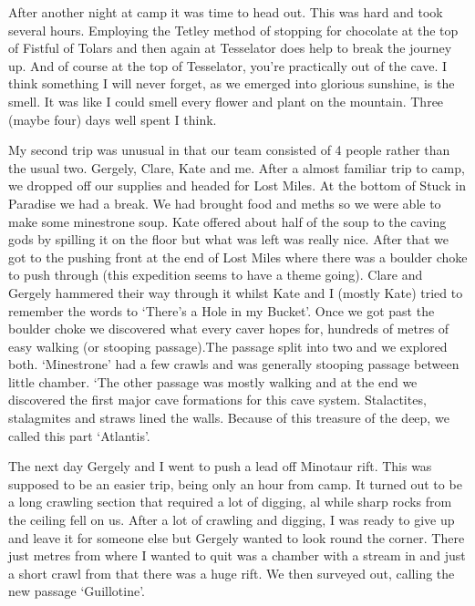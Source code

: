 After another night at camp it was time to head out. This was hard and took several hours. Employing the Tetley method of stopping for chocolate at the top of Fistful of Tolars and then again at Tesselator does help to break the journey up. And of course at the top of Tesselator, you’re practically out of the cave. I think something I will never forget, as we emerged into glorious sunshine, is the smell. It was like I could smell every flower and plant on the mountain. Three (maybe four) days well spent I think.

My second trip was unusual in that our team consisted of 4 people rather than the usual two. Gergely, Clare, Kate and me. After a almost familiar trip to camp, we dropped off our supplies and headed for Lost Miles. At the bottom of Stuck in Paradise we had a break. We had brought food and meths so we were able to make some minestrone soup. Kate offered about half of the soup to the caving gods by spilling it on the floor but what was left was really nice. After that we got to the pushing front at the end of Lost Miles where there was a boulder choke to push through (this expedition seems to have a theme going). Clare and Gergely hammered their way through it whilst Kate and I (mostly Kate) tried to remember the words to ‘There’s a Hole in my Bucket’. Once we got past the boulder choke we discovered what every caver hopes for, hundreds of metres of easy walking (or stooping passage).The passage split into two and we explored both. ‘Minestrone’ had a few crawls and was generally stooping passage between little chamber. ‘The other passage was mostly walking and at the end we discovered the first major cave formations for this cave system. Stalactites, stalagmites and straws lined the walls. Because of this treasure of the deep, we called this part ‘Atlantis’.

The next day Gergely and I went to push a lead off Minotaur rift. This was supposed to be an easier trip, being only an hour from camp. It turned out to be a long crawling section that required a lot of digging, al while sharp rocks from the ceiling fell on us. After a lot of crawling and digging, I was ready to give up and leave it for someone else but Gergely wanted to look round the corner. There just metres from where I wanted to quit was a chamber with a stream in and just a short crawl from that there was a huge rift. We then surveyed out, calling the new passage ‘Guillotine’.


